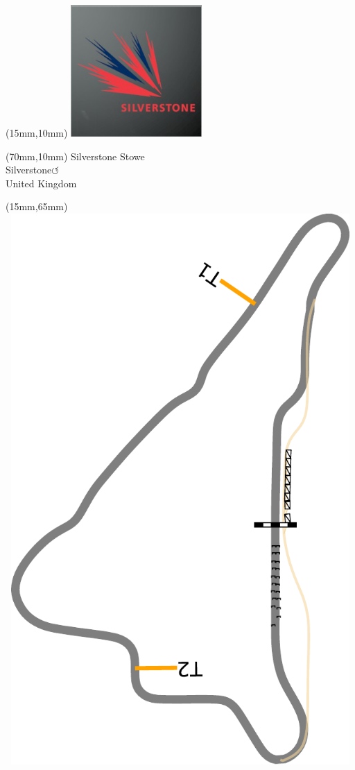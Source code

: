 \null\newpage
\begin{textblock*}{50mm}(15mm,10mm)%
\includegraphics[width=50mm]{LG/2015-05-20_00094.png}
\end{textblock*}
\begin{textblock*}{130mm}(70mm,10mm)%
{\fontsize{20}{20}\selectfont Silverstone Stowe\\}
{\fontsize{16}{16}\selectfont Silverstone\hfill \huge$\circlearrowleft$\\}
{\fontsize{12}{12}\selectfont United Kingdom\\}
\end{textblock*}
\begin{textblock*}{185mm}(15mm,65mm)%
\centering
\mbox{\includegraphics[width=185mm,height=210mm,keepaspectratio]{PT/SIST.pdf}}
\end{textblock*}
